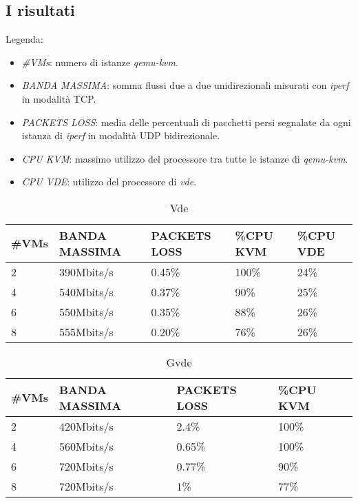 \subsection{I risultati}
Legenda:
\begin{itemize}
\item {\em \#VMs}: numero di istanze {\em qemu-kvm}.
\item {\em BANDA MASSIMA}: somma flussi due a due unidirezionali misurati con {\em iperf} in modalità TCP.
\item {\em PACKETS LOSS}: media delle percentuali di pacchetti persi segnalate da ogni istanza di {\em iperf} in modalità UDP bidirezionale.
\item {\em CPU KVM}: massimo utilizzo del processore tra tutte le istanze di {\em qemu-kvm}.
\item {\em CPU VDE}: utilizzo del processore di {\em vde}.
\end{itemize}
\begin{table}[h]
\begin{tabular}{|p{}|p{}|p{}|p{}|p{}|}
\hline
\#VMs    & BANDA MASSIMA       & PACKETS LOSS   & \%CPU KVM & \%CPU VDE \\
\hline
\hline
2       & 390Mbits/s         & 0.45\%   & 100\% & 24\% \\
\hline
4       & 540Mbits/s         & 0.37\%   & 90\% & 25\% \\
\hline
6       & 550Mbits/s         & 0.35\%  & 88\% & 26\% \\
\hline
8       & 555Mbits/s         & 0.20\%  & 76\% & 26\% \\
\hline
\end{tabular}
\caption{Vde}
\label{vde}
\end{table}
\begin{table}[h]
\begin{tabular}{|p{}|p{}|p{}|p{}|}
\hline
\#VMs    & BANDA MASSIMA       & PACKETS LOSS   & \%CPU KVM \\
\hline
\hline
2       & 420Mbits/s         & 2.4\%   & 100\% \\
\hline
4       & 560Mbits/s         & 0.65\%   & 100\% \\
\hline
6       & 720Mbits/s         & 0.77\%  & 90\% \\
\hline
8       & 720Mbits/s         & 1\%  & 77\% \\
\hline
\end{tabular}
\caption{Gvde}
\label{gvde}
\end{table}
